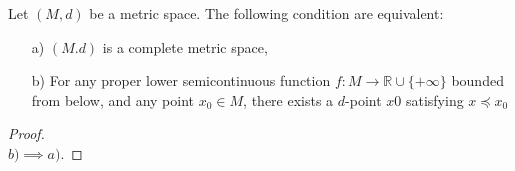     \begin{theorem}
        Let $(M, d)$ be a metric space. The following condition are equivalent:
        \begin{itemize}
            \item[a)]
                $(M.d)$ is a complete metric space,
            \item[b)]
                For any proper lower semicontinuous function  $f: M \to 
                \mathbb{R}\cup%
                \{+ \infty\} $  bounded from below, and any point $x_0 \in M$, 
                there 
                exists a $d$-point $x0$ satisfying $x \preceq x_0$
        \end{itemize}
    \end{theorem}
    \begin{proof} \hspace{1cm} \\
        $b) \implies a)$.
        

\end{proof}
